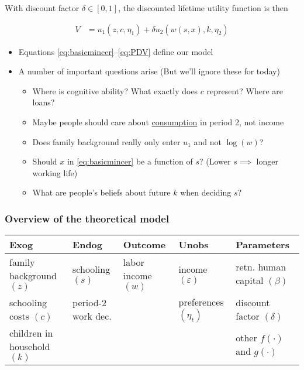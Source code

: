 \documentclass[11pt]{article}
\begin{document}
With discount factor \(\delta \in \left[0,1\right]\), the discounted lifetime utility function is then


\begin{align}
V & = u_1\left(z,c,\eta_1\right) + \delta u_2\left(w\left(s,x\right),k,\eta_2\right)
\label{eq:PDV}
\end{align}

\begin{itemize}
\item Equations \eqref{eq:basicmincer}–\eqref{eq:PDV} define our model
\item A number of important questions arise (But we'll ignore these for today)
\begin{itemize}
\item Where is cognitive ability? What exactly does \(c\) represent? Where are loans?
\item Maybe people should care about \uline{consumption} in period 2, not income
\item Does family background really only enter \(u_1\) and not \(\log\left(w\right)\)?
\item Should \(x\) in \eqref{eq:basicmincer} be a function of \(s\)? (Lower \(s \implies\) longer working life)
\item What are people's beliefs about future \(k\) when deciding \(s\)?
\end{itemize}
\end{itemize}


\subsubsection{Overview of the theoretical model}
\label{sec:org3cb833f}

\begin{center}
\begin{tabular}{lllll}
\hline
\textbf{Exog} & \textbf{Endog} & \textbf{Outcome} & \textbf{Unobs} & \textbf{Parameters}\\
\hline
family background \((z)\) & schooling \((s)\) & labor income \((w)\) & income \((\varepsilon)\) & retn. human capital \((\beta)\)\\
schooling costs \((c)\) & period-2 work dec. &  & preferences \((\eta_t)\) & discount factor \((\delta)\)\\
children in household \((k)\) &  &  &  & other \(f(\cdot)\) and \(g(\cdot)\)\\
\hline
\end{tabular}
\end{center}
\end{document}
